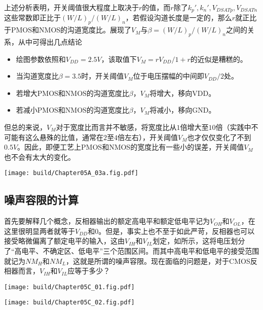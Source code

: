 上述分析表明，开关阈值很大程度上取决于$r$的值，而$r$除了$k_p',k_n',V_{DSATp},V_{DSATn}$这些常数即正比于$(W/L)_p/(W/L)_n$，若假设沟道长度是一定的，那么$r$就正比于PMOS和NMOS的沟道宽度比。展现了$V_M$与$\beta=(W/L)_p/(W/L)_n$之间的关系，从中可得出几点结论
\begin{itemize}
    \item 绘图参数依照和$V_{DD}=2.5\si{V}$，该取值下$V_M=rV_{DD}/1+r$的近似是糟糕的。
    \item 当沟道宽度比$\beta=3.5$时，开关阈值$V_{M}$位于电压摆幅的中间即$V_{DD}/2$处。
    \item 若增大PMOS和NMOS的沟道宽度比$\beta$，$V_M$将增大，移向VDD。
    \item 若减小PMOS和NMOS的沟道宽度比$\beta$，$V_M$将减小，移向GND。
\end{itemize}
但总的来说，$V_M$对于宽度比而言并不敏感，将宽度比从$1$倍增大至$10$倍（实践中不可能有这么悬殊的比值，通常在$2$至$4$倍左右），开关阈值$V_M$也才仅仅变化了不到$0.5\si{V}$。因此，即便工艺上PMOS和NMOS的宽度比有一些小的误差，开关阈值$V_M$也不会有太大的变化。
\begin{Figure}[CMOS反相器的开关阈值]
    \texttt{[image: build/Chapter05A\_03a.fig.pdf]}\hspace{0.7cm}
\end{Figure}

\subsection{噪声容限的计算}
首先要解释几个概念，反相器输出的额定高电平和额定低电平记为$V_{OH}$和$V_{OL}$，在这里很明显两者就等于$V_{DD}$和$0$。但是，事实上也不至于如此严苛，反相器也可以接受略微偏离了额定电平的输入，这由$V_{IH}$和$V_{IL}$划定，如所示，这将电压划分了“高电平、不确定区、低电平”三个范围区间。而其中高电平和低电平的接受范围就记为$NM_{H}$和$NM_{L}$，这就是所谓的噪声容限。现在面临的问题是，对于CMOS反相器而言，$V_{IH}$和$V_{IL}$应等于多少？

\begin{Figure}[CMOS反相器的噪声容限]
    \begin{FigureSub}[反相器逻辑电平的范围]
        \texttt{[image: build/Chapter05C\_01.fig.pdf]}
    \end{FigureSub}
    \hspace{0.5cm}
    \begin{FigureSub}[反相器VTC曲线的线性近似]
        \texttt{[image: build/Chapter05C\_02.fig.pdf]}
    \end{FigureSub}
\end{Figure}

